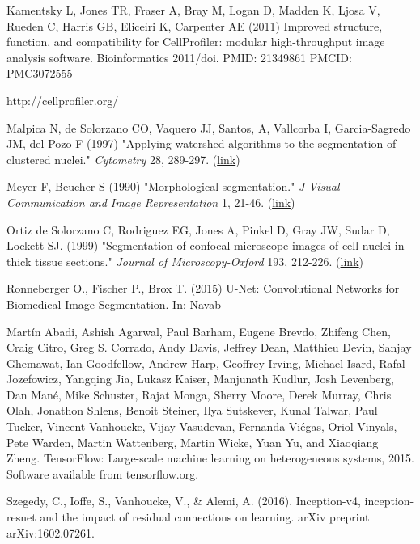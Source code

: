 \documentclass[12pt,a4paper]{article}
\begin{document}
\newpage
\begin{thebibliography}{9}
Kamentsky L, Jones TR, Fraser A, Bray M, Logan D, Madden K, Ljosa V, Rueden C, Harris GB, Eliceiri K, Carpenter AE (2011) Improved structure, function, and compatibility for CellProfiler: modular high-throughput image analysis software. Bioinformatics 2011/doi. PMID: 21349861 PMCID: PMC3072555

http://cellprofiler.org/

Malpica N, de Solorzano CO, Vaquero JJ, Santos, A, Vallcorba I, Garcia-Sagredo JM, del Pozo
    F (1997) "Applying watershed algorithms to the segmentation of clustered nuclei."
    \textit{Cytometry} 28, 289-297. (\href{http://dx.doi.org/10.1002/(SICI)1097-0320(19970801)28:4\%3C289::AID-CYTO3\%3E3.0.CO;2-7}{link})
    

Meyer F, Beucher S (1990) "Morphological segmentation." \textit{J Visual Communication and Image
    Representation} 1, 21-46. (\href{http://dx.doi.org/10.1016/1047-3203(90)90014-M}{link})
 
Ortiz de Solorzano C, Rodriguez EG, Jones A, Pinkel D, Gray JW, Sudar D, Lockett SJ. (1999)
    "Segmentation of confocal microscope images of cell nuclei in thick tissue sections."
    \textit{Journal of Microscopy-Oxford} 193, 212-226. (\href{http://dx.doi.org/10.1046/j.1365-2818.1999.00463.x}{link})
 
Ronneberger O., Fischer P., Brox T. (2015) U-Net: Convolutional Networks for Biomedical Image Segmentation. In: Navab 

Martín Abadi, Ashish Agarwal, Paul Barham, Eugene Brevdo,
Zhifeng Chen, Craig Citro, Greg S. Corrado, Andy Davis,
Jeffrey Dean, Matthieu Devin, Sanjay Ghemawat, Ian Goodfellow,
Andrew Harp, Geoffrey Irving, Michael Isard, Rafal Jozefowicz, Yangqing Jia,
Lukasz Kaiser, Manjunath Kudlur, Josh Levenberg, Dan Mané, Mike Schuster,
Rajat Monga, Sherry Moore, Derek Murray, Chris Olah, Jonathon Shlens,
Benoit Steiner, Ilya Sutskever, Kunal Talwar, Paul Tucker,
Vincent Vanhoucke, Vijay Vasudevan, Fernanda Viégas,
Oriol Vinyals, Pete Warden, Martin Wattenberg, Martin Wicke,
Yuan Yu, and Xiaoqiang Zheng.
TensorFlow: Large-scale machine learning on heterogeneous systems,
2015. Software available from tensorflow.org.

Szegedy, C., Ioffe, S., Vanhoucke, V., & Alemi, A. (2016). Inception-v4, inception-resnet and the impact of residual connections on learning. arXiv preprint arXiv:1602.07261.
\end{thebibliography}
\end{document}
